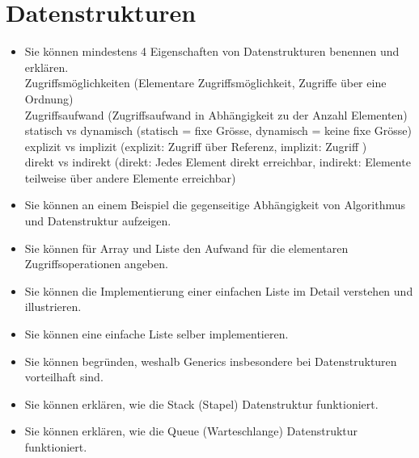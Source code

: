 \section{Datenstrukturen}
\begin{itemize}
  \item Sie können mindestens 4 Eigenschaften von Datenstrukturen benennen und erklären. \\
        Zugriffsmöglichkeiten (Elementare Zugriffsmöglichkeit, Zugriffe über eine Ordnung) \\
        Zugriffsaufwand (Zugriffsaufwand in Abhängigkeit zu der Anzahl Elementen) \\
        statisch vs dynamisch (statisch = fixe Grösse, dynamisch = keine fixe Grösse) \\
        explizit vs implizit (explizit: Zugriff über Referenz, implizit: Zugriff ) \\
        direkt vs indirekt (direkt: Jedes Element direkt erreichbar, indirekt: Elemente teilweise über andere Elemente erreichbar)
  \item Sie können an einem Beispiel die gegenseitige Abhängigkeit von Algorithmus und Datenstruktur aufzeigen. \\
        
  \item Sie können für Array und Liste den Aufwand für die elementaren Zugriffsoperationen angeben. \\
        
  \item Sie können die Implementierung einer einfachen Liste im Detail verstehen und illustrieren. \\
        
  \item Sie können eine einfache Liste selber implementieren. \\
        
  \item Sie können begründen, weshalb Generics insbesondere bei Datenstrukturen vorteilhaft sind. \\
        
  \item Sie können erklären, wie die Stack (Stapel) Datenstruktur funktioniert. \\
        
  \item Sie können erklären, wie die Queue (Warteschlange) Datenstruktur funktioniert. \\
        

\end{itemize}
